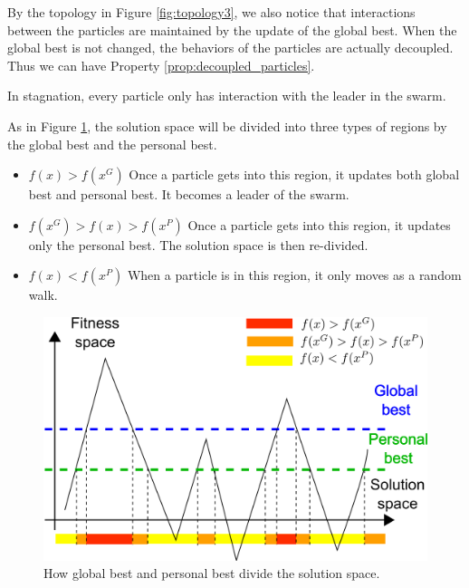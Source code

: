 By the topology in Figure \ref{fig:topology3}, we also notice that interactions between the particles are maintained by the update of the global best.
When the global best is not changed, the behaviors of the particles are actually decoupled.
Thus we can have Property \ref{prop:decoupled_particles}.

\begin{property}
\label{prop:decoupled_particles}
In stagnation, every particle only has interaction with the leader in the swarm.
\end{property}

As in Figure \ref{fig:categorize_regions}, the solution space will be divided into three types of regions by the global best and the personal best.
\begin{itemize}
\item $ f(x) > f(x^G) $
Once a particle gets into this region, it updates both global best and personal best. 
It becomes a leader of the swarm.
\item $ f(x^{G}) > f(x) > f(x^{P}) $
Once a particle gets into this region, it updates only the personal best.
The solution space is then re-divided.
\item $ f(x) < f(x^{P}) $
When a particle is in this region, it only moves as a random walk.
\end{itemize}

\begin{figure}
\centering
\includegraphics[width=0.7\linewidth]{./categorize_regions}
\caption{How global best and personal best divide the solution space.}
\label{fig:categorize_regions}
\end{figure}


